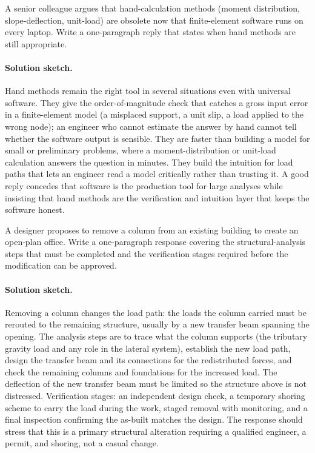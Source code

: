 \begin{exercise}
A senior colleague argues that hand-calculation methods (moment
distribution, slope-deflection, unit-load) are obsolete now that
finite-element software runs on every laptop. Write a one-paragraph
reply that states when hand methods are still appropriate.

\paragraph{Solution sketch.} Hand methods remain the right tool in
several situations even with universal software. They give the
order-of-magnitude check that catches a gross input error in a
finite-element model (a misplaced support, a unit slip, a load applied
to the wrong node); an engineer who cannot estimate the answer by hand
cannot tell whether the software output is sensible. They are faster
than building a model for small or preliminary problems, where a
moment-distribution or unit-load calculation answers the question in
minutes. They build the intuition for load paths that lets an engineer
read a model critically rather than trusting it. A good reply concedes
that software is the production tool for large analyses while insisting
that hand methods are the verification and intuition layer that keeps
the software honest.
\end{exercise}

\begin{exercise}
A designer proposes to remove a column from an existing building to
create an open-plan office. Write a one-paragraph response covering
the structural-analysis steps that must be completed and the
verification stages required before the modification can be
approved.

\paragraph{Solution sketch.} Removing a column changes the load path:
the loads the column carried must be rerouted to the remaining
structure, usually by a new transfer beam spanning the opening. The
analysis steps are to trace what the column supports (the tributary
gravity load and any role in the lateral system), establish the new
load path, design the transfer beam and its connections for the
redistributed forces, and check the remaining columns and foundations
for the increased load. The deflection of the new transfer beam must be
limited so the structure above is not distressed. Verification stages:
an independent design check, a temporary shoring scheme to carry the
load during the work, staged removal with monitoring, and a final
inspection confirming the as-built matches the design. The response
should stress that this is a primary structural alteration requiring a
qualified engineer, a permit, and shoring, not a casual change.
\end{exercise}

